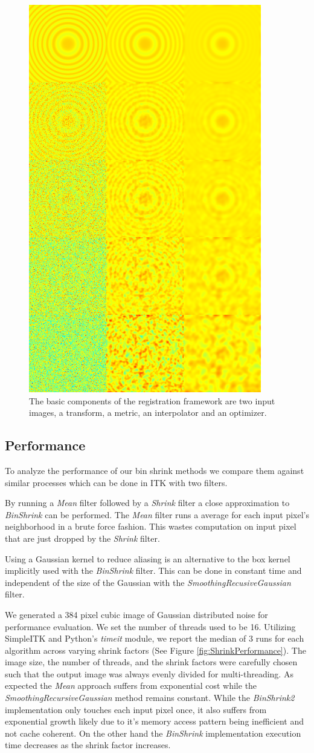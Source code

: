 \documentclass{InsightArticle}
\begin{document}
\begin{figure}
  \centering
  \includegraphics[width=0.4\linewidth]{images/gaussianshrink_hot.png}
  \caption[Registration Framework Components]{The basic components of the
    registration framework are two input images, a transform, a metric, an
    interpolator and an optimizer.}
  \label{fig:GaussianShrinkComparison}
\end{figure}

\subsection{Performance}

To analyze the performance of our bin shrink methods we compare them
against similar processes which can be done in ITK with two filters.

By running a \textit{Mean} filter followed by a \textit{Shrink} filter a
close approximation to \textit{BinShrink} can be performed. The
\textit{Mean} filter runs a average for each input pixel's
neighborhood in a brute force fashion. This wastes computation on input
pixel that are just dropped by the \textit{Shrink} filter.

Using a Gaussian kernel to reduce aliasing is an alternative to the box
kernel implicitly used with the \textit{BinShrink} filter. This can be
done in constant time and independent of the size of the Gaussian with
the \textit{SmoothingRecusiveGaussian} filter.

We generated a 384 pixel cubic image of Gaussian distributed noise for
performance evaluation. We set the number of threads used to be
16. Utilizing SimpleITK and Python's
\textit{timeit} module, we report the median of 3 runs for each
algorithm across varying shrink factors (See Figure
\ref{fig:ShrinkPerformance}).  The image size, the number of threads,
and the shrink factors were carefully chosen such that the output
image was always evenly divided for multi-threading. As expected the
\textit{Mean} approach suffers from exponential cost while the
\textit{SmoothingRecursiveGaussian} method remains constant. While the
\textit{BinShrink2} implementation only touches each input pixel once,
it also suffers from exponential growth likely due to it's memory
access pattern being inefficient and not cache coherent. On the other
hand the \textit{BinShrink} implementation execution time decreases as
the shrink factor increases.
\end{document}
